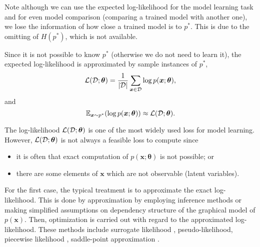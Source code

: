 Note although we can use the expected log-likelihood for the model learning task and for even model comparison (comparing a trained model with another one), we lose the information of how close a trained model is to $p^{\ast}$. This is due to the omitting of $H(p^{\ast})$, which is not available.

Since it is not possible to know $p^{\ast}$ (otherwise we do not need to learn it), the expected log-likelihood is approximated by sample instances of $p^{\ast}$,
\begin{equation}
  \mathcal{L}(\mathcal{D}; \bm{\theta}) = \frac{1}{| \mathcal{D} |}\sum_{\bm{x}\in \mathcal{D}}\log{p(\bm{x};\bm{\theta})},
\end{equation}
and
\begin{equation}
  \mathbb{E}_{\bm{x}\sim p^{\ast}}(\log{{p(\bm{x}; \bm{\theta})}}) \approx \mathcal{L}(\mathcal{D}; \bm{\theta}).
\end{equation}

The log-likelihood $\mathcal{L}(\mathcal{D}; \bm{\theta})$ is one of the most widely used loss for model learning. However, $\mathcal{L}(\mathcal{D}; \bm{\theta})$ is not always a feasible loss to compute since
\begin{itemize}
\item it is often that exact computation of $p(\bm{x};\bm{\theta})$ is not possible; or
\item there are some elements of $\bm{x}$ which are not observable (latent variables).
\end{itemize}
For the first case, the typical treatment is to approximate the exact log-likelihood. This is done by approximation by employing inference methods or   making simplified assumptions on dependency structure of the graphical model of $p(\bm{x})$. Then, optimization is carried out with regard to the approximated log-likelihood. These methods include surrogate likelihood \cite{wainwright06estimating, lu2019blockBP}, pseudo-likelihood\cite{qu2019gmnn, lazarogredilla2019learning}, piecewise likelihood \cite{sutton2012piecewise, lin_2016_CVPR}, saddle-point approximation \cite{srikumar-etal-2012-amortizing, NIPS2019_9687}.

